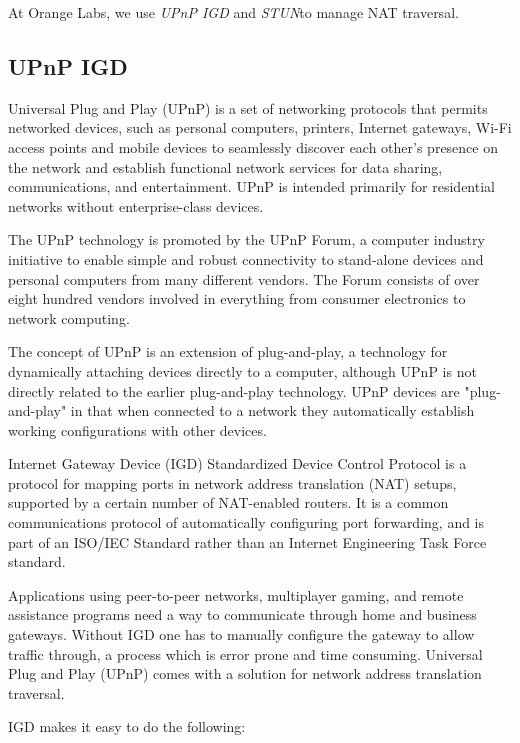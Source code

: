 At Orange Labs, we use \textit{UPnP IGD} and \textit{STUN}to manage NAT traversal.
\subsection{UPnP IGD}

Universal Plug and Play (UPnP)\cite{jeronimo2003upnp} is a set of networking protocols that permits networked devices, such as personal computers, printers, Internet gateways, Wi-Fi access points and mobile devices to seamlessly discover each other's presence on the network and establish functional network services for data sharing, communications, and entertainment. UPnP is intended primarily for residential networks without enterprise-class devices.

The UPnP technology is promoted by the UPnP Forum, a computer industry initiative to enable simple and robust connectivity to stand-alone devices and personal computers from many different vendors. The Forum consists of over eight hundred vendors involved in everything from consumer electronics to network computing.

The concept of UPnP is an extension of plug-and-play, a technology for dynamically attaching devices directly to a computer, although UPnP is not directly related to the earlier plug-and-play technology. UPnP devices are "plug-and-play" in that when connected to a network they automatically establish working configurations with other devices.

Internet Gateway Device (IGD) Standardized Device Control Protocol is a protocol for mapping ports in network address translation (NAT) setups, supported by a certain number of NAT-enabled routers.\cite{wing2013p} It is a common communications protocol of automatically configuring port forwarding, and is part of an ISO/IEC Standard \cite{sherwin2009upnp} rather than an Internet Engineering Task Force standard.

Applications using peer-to-peer networks, multiplayer gaming, and remote assistance programs need a way to communicate through home and business gateways. Without IGD one has to manually configure the gateway to allow traffic through, a process which is error prone and time consuming. Universal Plug and Play (UPnP) comes with a solution for network address translation traversal.

IGD makes it easy to do the following:

